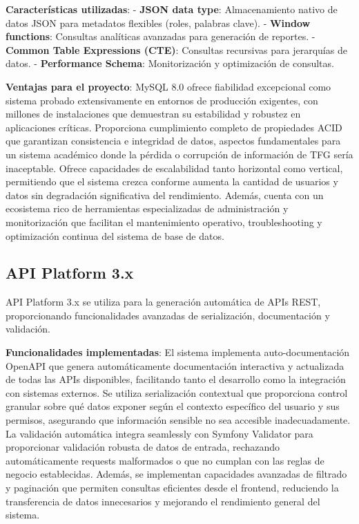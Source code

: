 \documentclass[12pt,a4paper,oneside]{report}
\begin{document}
\textbf{Características utilizadas}: - \textbf{JSON data type}:
Almacenamiento nativo de datos JSON para metadatos flexibles (roles,
palabras clave). - \textbf{Window functions}: Consultas analíticas
avanzadas para generación de reportes. - \textbf{Common Table
Expressions (CTE)}: Consultas recursivas para jerarquías de datos. -
\textbf{Performance Schema}: Monitorización y optimización de consultas.

\textbf{Ventajas para el proyecto}: MySQL 8.0 ofrece fiabilidad excepcional como sistema probado extensivamente en entornos de producción exigentes, con millones de instalaciones que demuestran su estabilidad y robustez en aplicaciones críticas. Proporciona cumplimiento completo de propiedades ACID que garantizan consistencia e integridad de datos, aspectos fundamentales para un sistema académico donde la pérdida o corrupción de información de TFG sería inaceptable. Ofrece capacidades de escalabilidad tanto horizontal como vertical, permitiendo que el sistema crezca conforme aumenta la cantidad de usuarios y datos sin degradación significativa del rendimiento. Además, cuenta con un ecosistema rico de herramientas especializadas de administración y monitorización que facilitan el mantenimiento operativo, troubleshooting y optimización continua del sistema de base de datos.

\subsection{API Platform 3.x}\label{api-platform-3.x}

API Platform 3.x se utiliza para la generación automática de APIs REST,
proporcionando funcionalidades avanzadas de serialización, documentación
y validación.

\textbf{Funcionalidades implementadas}: El sistema implementa auto-documentación OpenAPI que genera automáticamente documentación interactiva y actualizada de todas las APIs disponibles, facilitando tanto el desarrollo como la integración con sistemas externos. Se utiliza serialización contextual que proporciona control granular sobre qué datos exponer según el contexto específico del usuario y sus permisos, asegurando que información sensible no sea accesible inadecuadamente. La validación automática integra seamlessly con Symfony Validator para proporcionar validación robusta de datos de entrada, rechazando automáticamente requests malformados o que no cumplan con las reglas de negocio establecidas. Además, se implementan capacidades avanzadas de filtrado y paginación que permiten consultas eficientes desde el frontend, reduciendo la transferencia de datos innecesarios y mejorando el rendimiento general del sistema.
\end{document}
